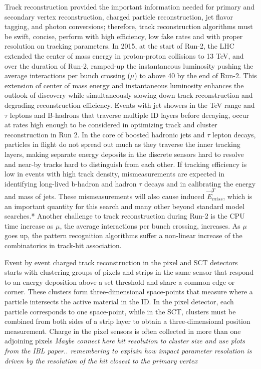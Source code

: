 Track reconstruction provided the important information needed for primary and secondary vertex reconstruction, charged particle reconstruction, jet flavor tagging, and photon conversions; therefore, track reconstruction algorithms must be swift, concise, perform with high efficiency, low fake rates and with proper resolution on tracking parameters.  In 2015, at the start of Run-2, the LHC extended the center of mass energy in proton-proton collisions to 13 TeV, and over the duration of Run-2, ramped-up the instantaneous luminosity pushing the average interactions per bunch crossing ($\mu$) to above 40 by the end of Run-2.  This extension of center of mass energy and instantaneous luminosity enhances the outlook of discovery while simultaneously slowing down track reconstruction and degrading reconstruction efficiency.  Events with jet showers in the TeV range and $\tau$ leptons and B-hadrons that traverse multiple ID layers before decaying, occur at rates high enough to be considered in optimizing track and cluster reconstruction in Run 2.  In the core of boosted hadronic jets and $\tau$ lepton decays, particles in flight do not spread out much as they traverse the inner tracking layers, making separate energy deposits in the discrete sensors hard to resolve and near-by tracks hard to distinguish from each other.  If tracking efficiency is low in events with high track density, mismeasurements are expected in identifying long-lived b-hadron and hadron $\tau$ decays and in calibrating the energy and mass of jets.  These mismeasurements will also cause induced $\vec{E}^T_{miss}$, which is an important quantity for this search and many other beyond standard model searches.* Another challenge to track reconstruction during Run-2 is the CPU time increase as $\mu$, the average interactions per bunch crossing, increases.  As $\mu$ goes up, the pattern recognition algorithms suffer a non-linear increase of the combinatorics in track-hit association.  

Event by event charged track reconstruction in the pixel and SCT detectors starts with clustering groups of pixels and strips in the same sensor that respond to an energy deposition above a set threshold and share a common edge or corner.  These clusters form three-dimensional space-points that measure where a particle intersects the active material in the ID.  In the pixel detector, each particle corresponds to one space-point, while in the SCT, clusters must be combined from both sides of a strip layer to obtain a three-dimensional position measurement.  Charge in the pixel sensors is often collected in more than one adjoining pixels \textit{Maybe connect here hit resolution to cluster size and use plots from the IBL paper.. remembering to explain how impact parameter resolution is driven by the resolution of the hit closest to the primary vertex}

